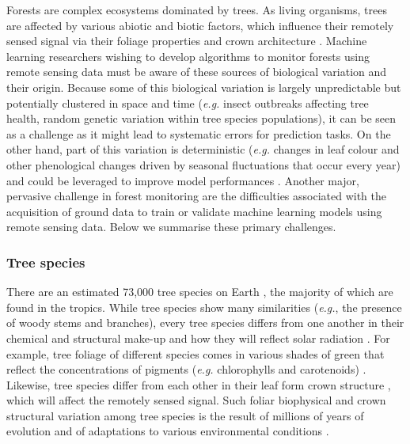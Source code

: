 \documentclass{CUP-JNL-DTM}%
\theoremstyle{definition}
\numberwithin{equation}{section}
\begin{document}
Forests are complex ecosystems dominated by trees. As living organisms, trees are affected by various abiotic and biotic factors, which influence their remotely sensed signal via their foliage properties and crown architecture \cite{kulawardhana_remote_2011}. Machine learning researchers wishing to develop algorithms to monitor forests using remote sensing data must be aware of these sources of biological variation and their origin. Because some of this biological variation is largely unpredictable but potentially clustered in space and time (\textit{e.g.} insect outbreaks affecting tree health, random genetic variation within tree species populations), it can be seen as a challenge as it might lead to systematic errors for prediction tasks. On the other hand, part of this variation is deterministic (\textit{e.g.} changes in leaf colour and other phenological changes driven by seasonal fluctuations that occur every year) and could be leveraged to improve model performances \cite{cloutier_influence_2023}. Another major, pervasive challenge in forest monitoring are the difficulties associated with the acquisition of ground data to train or validate machine learning models using remote sensing data. Below we summarise these primary challenges.


\subsubsection{Tree species} 
\label{sec:challenge_species}

There are an estimated 73,000 tree species on Earth \cite{cazzolla_gatti_number_2022}, the majority of which are found in the tropics. While tree species show many similarities (\textit{e.g.}, the presence of woody stems and branches), every tree species differs from one another in their chemical and structural make-up and how they will reflect solar radiation \cite{asner_functional_2014}. For example, tree foliage of different species comes in various shades of green that reflect the concentrations of pigments (\textit{e.g.} chlorophylls and carotenoids) \cite{gates_spectral_1965}. Likewise, tree species differ from each other in their leaf form crown structure \cite{verbeeck_time_2019}, which will affect the remotely sensed signal. Such foliar biophysical and crown structural variation among tree species is the result of millions of years of evolution and of adaptations to various environmental conditions \cite{meireles_leaf_2020}.
\end{document}
